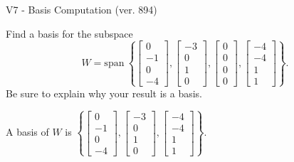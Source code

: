 \begin{exercise}
  \begin{exerciseTitle}V7 - Basis Computation (ver. 894)\end{exerciseTitle}
  \begin{exerciseStatement}
    Find a basis for the subspace 
\[W=\mathrm{span}\ \left\{\left[\begin{array}{r}
0 \\
-1 \\
0 \\
-4
\end{array}\right] , \left[\begin{array}{r}
-3 \\
0 \\
1 \\
0
\end{array}\right] , \left[\begin{array}{r}
0 \\
0 \\
0 \\
0
\end{array}\right] , \left[\begin{array}{r}
-4 \\
-4 \\
1 \\
1
\end{array}\right]\right\}.\]
 Be sure to explain why your result is a basis.


  \end{exerciseStatement}
  \begin{exerciseAnswer}
   A basis of \(W\) is  \(\left\{\left[\begin{array}{r}
0 \\
-1 \\
0 \\
-4
\end{array}\right] , \left[\begin{array}{r}
-3 \\
0 \\
1 \\
0
\end{array}\right] , \left[\begin{array}{r}
-4 \\
-4 \\
1 \\
1
\end{array}\right]\right\}\).
  


  \end{exerciseAnswer}
\end{exercise}